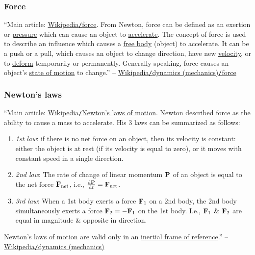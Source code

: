 \documentclass{article}
\begin{document}
\subsubsection{Force}
``Main article: \href{https://en.wikipedia.org/wiki/Force}{Wikipedia{\tt/}force}. From Newton, force can be defined as an exertion or \href{https://en.wikipedia.org/wiki/Pressure}{pressure} which can cause an object to \href{https://en.wikipedia.org/wiki/Accelerate}{accelerate}. The concept of force is used to describe an influence which causes a \href{https://en.wikipedia.org/wiki/Free_body}{free body} (object) to accelerate. It can be a push or a pull, which causes an object to change direction, have new \href{https://en.wikipedia.org/wiki/Velocity}{velocity}, or to \href{https://en.wikipedia.org/wiki/Deformation_(mechanics)}{deform} temporarily or permanently. Generally speaking, force causes an object's \href{https://en.wikipedia.org/wiki/Motion_(physics)}{state of motion} to change.'' -- \href{https://en.wikipedia.org/wiki/Dynamics_(mechanics)#Force}{Wikipedia{\tt/}dynamics (mechanics){\tt/}force}

\subsubsection{Newton's laws}
``Main article: \href{https://en.wikipedia.org/wiki/Newton%27s_laws_of_motion}{Wikipedia{\tt/}Newton's laws of motion}. Newton described force as the ability to cause a mass to accelerate. His 3 laws can be summarized as follows:
\begin{enumerate}
	\item \textit{1st law}: if there is no net force on an object, then its velocity is constant: either the object is at rest (if its velocity is equal to zero), or it moves with constant speed in a single direction.
	\item \textit{2nd law}: The rate of change of linear momentum ${\bf P}$ of an object is equal to the net force ${\bf F}_{\rm net}$, i.e., $\frac{{\rm d}{\bf P}}{{\rm d}t} = {\bf F}_{\rm net}$.
	\item \textit{3rd law}: When a 1st body exerts a force ${\bf F}_1$ on a 2nd body, the 2nd body simultaneously exerts a force ${\bf F}_2 = -{\bf F}_1$ on the 1st body. I.e., ${\bf F}_1$ \& ${\bf F}_2$ are equal in magnitude \& opposite in direction.
\end{enumerate}
Newton's laws of motion are valid only in an \href{https://en.wikipedia.org/wiki/Inertial_frame_of_reference}{inertial frame of reference}.'' -- \href{https://en.wikipedia.org/wiki/Dynamics_(mechanics)}{Wikipedia{\tt/}dynamics (mechanics)}
\end{document}
